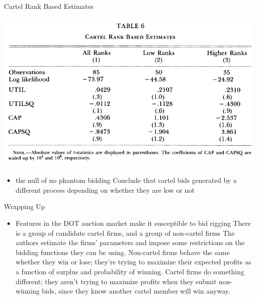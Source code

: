 \documentclass[dvipsnames]{beamer}
\begin{document}
%
\begin{frame}{Cartel Rank Based Estimates}
  \begin{center}
   \includegraphics[width=\textwidth, keepaspectratio=true]{tab6.png}
  \end{center}
  \begin{itemize}
  \item {} the null of no phantom bidding
    \vitem Conclude that cartel bids  generated by a different process depending on whether they are low or not
  \end{itemize}
\end{frame}
%
\begin{frame}{Wrapping Up}
  \begin{itemize}
  \item Features in the DOT auction market make it susceptible to bid rigging
    \vitem There is a group of candidate cartel firms, and a group of non-cartel firms
    \vitem The authors estimate the firms' parameters and impose some restrictions on the bidding functions they can be using.
    \vitem Non-cartel firms behave the same whether they win or lose; they're trying to maximize their expected profits as a function of surplus and probability of winning.
    \vitem Cartel firms do something different; they aren't trying to maximize profits when they submit non-winning bids, since they know another cartel member will win anyway.
  \end{itemize}
\end{frame}
\end{document}
